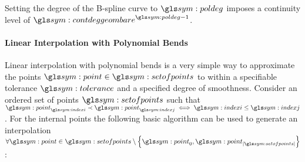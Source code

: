 

				Setting the degree of the B-spline curve to $\poldeg$ imposes a
				continuity level of $\contdeggeom{\poldeg - 1}$.
		\label{sec:multi_dimensional_approximation_trajectories}

			\paragraph{Linear Interpolation with Polynomial Bends}%
			\label{sec:linear_interpolation_with_polynomial_bends}

				Linear interpolation with polynomial bends is a very simple way
				to approximate the points $\point\in\setofpoints$ to within a
				specifiable tolerance $\tol$ and a specified degree of
				smoothness.  Consider an ordered set of points $\setofpoints$
				such that $\point_{\indexi} \prec \point_{\indexj} \iff \indexi
				\leq \indexj$. For the internal points the following basic
				algorithm can be used to generate an interpolation
				\(
					\forall \point \in
						\setofpoints\setminus
							\left\{
								\point_0,
								\point_{\cardinality{\setofpoints}}
							\right\}
				\):

